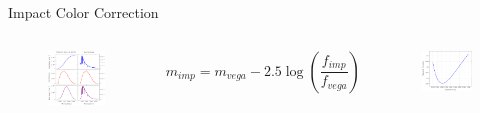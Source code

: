 \documentclass[pdf]{beamer}
\begin{document}
 \begin{frame}{Impact Color Correction}
   \begin{columns}
	 \begin{figure}[ht!]
	   \centering
	   \includegraphics[width=\textwidth]{Images/Convolve_Example.pdf}
	 \end{figure}
	 \[m_{imp} = m_{vega} - 2.5\log\left( \frac{f_{imp}}{f_{vega}} \right)\]
	 \begin{figure}[ht!]
	   \centering
	   \includegraphics[width=\textwidth]{Images/REx_Correction.pdf}
	 \end{figure}
   \end{columns}
 \end{frame}
\end{document}
